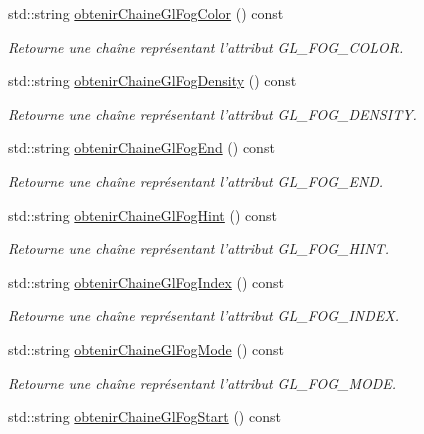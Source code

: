 \begin{DoxyCompactItemize}
std\-::string \hyperlink{group__utilitaire_ga572f199118c8cb77085a7eb21f05f7fb}{obtenir\-Chaine\-Gl\-Fog\-Color} () const 
\begin{DoxyCompactList}\small\item\em Retourne une chaîne représentant l'attribut G\-L\-\_\-\-F\-O\-G\-\_\-\-C\-O\-L\-O\-R. \end{DoxyCompactList}\item 
std\-::string \hyperlink{group__utilitaire_ga9ad8c1de41bc053666ffe001bca8f064}{obtenir\-Chaine\-Gl\-Fog\-Density} () const 
\begin{DoxyCompactList}\small\item\em Retourne une chaîne représentant l'attribut G\-L\-\_\-\-F\-O\-G\-\_\-\-D\-E\-N\-S\-I\-T\-Y. \end{DoxyCompactList}\item 
std\-::string \hyperlink{group__utilitaire_ga9c6edbc286eed9a47b2e3ed2426e2b92}{obtenir\-Chaine\-Gl\-Fog\-End} () const 
\begin{DoxyCompactList}\small\item\em Retourne une chaîne représentant l'attribut G\-L\-\_\-\-F\-O\-G\-\_\-\-E\-N\-D. \end{DoxyCompactList}\item 
std\-::string \hyperlink{group__utilitaire_ga8bd30ecaffe9f7d38e7a447a185dc8d0}{obtenir\-Chaine\-Gl\-Fog\-Hint} () const 
\begin{DoxyCompactList}\small\item\em Retourne une chaîne représentant l'attribut G\-L\-\_\-\-F\-O\-G\-\_\-\-H\-I\-N\-T. \end{DoxyCompactList}\item 
std\-::string \hyperlink{group__utilitaire_ga929e0d580e014af6abda36f16fce43c3}{obtenir\-Chaine\-Gl\-Fog\-Index} () const 
\begin{DoxyCompactList}\small\item\em Retourne une chaîne représentant l'attribut G\-L\-\_\-\-F\-O\-G\-\_\-\-I\-N\-D\-E\-X. \end{DoxyCompactList}\item 
std\-::string \hyperlink{group__utilitaire_ga1f28b3ec34f9bd4a2080e1252ca64d57}{obtenir\-Chaine\-Gl\-Fog\-Mode} () const 
\begin{DoxyCompactList}\small\item\em Retourne une chaîne représentant l'attribut G\-L\-\_\-\-F\-O\-G\-\_\-\-M\-O\-D\-E. \end{DoxyCompactList}\item 
std\-::string \hyperlink{group__utilitaire_ga7063764912254ec440429aee9e8c3f83}{obtenir\-Chaine\-Gl\-Fog\-Start} () const 

\end{DoxyCompactItemize}
